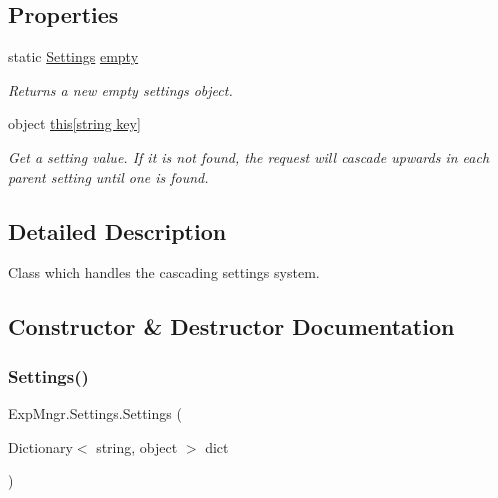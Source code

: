 \subsection*{Properties}
\begin{DoxyCompactItemize}
\item 
static \hyperlink{class_exp_mngr_1_1_settings}{Settings} \hyperlink{class_exp_mngr_1_1_settings_a9a79c93bbbd6158a6ae543a615da6e6a}{empty}
\begin{DoxyCompactList}\small\item\em Returns a new empty settings object. \end{DoxyCompactList}\item 
object \hyperlink{class_exp_mngr_1_1_settings_a120aa21f86686537a44e92c9f96dd68e}{this\mbox{[}string key\mbox{]}}
\begin{DoxyCompactList}\small\item\em Get a setting value. If it is not found, the request will cascade upwards in each parent setting until one is found. \end{DoxyCompactList}\end{DoxyCompactItemize}


\subsection{Detailed Description}
Class which handles the cascading settings system. 



\subsection{Constructor \& Destructor Documentation}
\mbox{\label{class_exp_mngr_1_1_settings_aa0972d4f675ba6bf860f1758ecb5b1fa}} 
\subsubsection{\texorpdfstring{Settings()}{Settings()}}
{\footnotesize\ttfamily Exp\+Mngr.\+Settings.\+Settings (\begin{DoxyParamCaption}\item[{Dictionary$<$ string, object $>$}]{dict }\end{DoxyParamCaption})}



